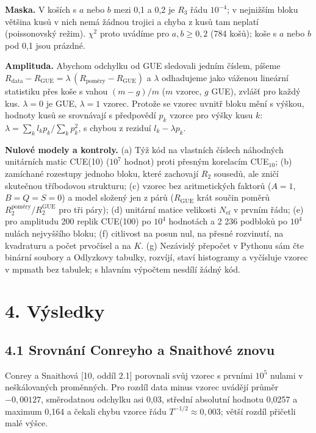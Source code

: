 \documentclass[
  10pt,
]{article}
\begin{document}
\textbf{Maska.} V koších s \(a\) nebo \(b\) mezi 0,1 a 0,2 je \(R_3\)
řádu \(10^{-4}\); v nejnižším bloku většina kusů v nich nemá žádnou
trojici a chyba z kusů tam neplatí (poissonovský režim). \(\chi^2\)
proto uvádíme pro \(a, b \ge 0{,}2\) (784 košů); koše s \(a\) nebo \(b\)
pod 0,1 jsou prázdné.

\textbf{Amplituda.} Abychom odchylku od GUE sledovali jedním číslem,
píšeme
\(R_{\mathrm{data}} - R_{\mathrm{GUE}} = \lambda\,(R_{\mathrm{poměry}} - R_{\mathrm{GUE}})\)
a \(\lambda\) odhadujeme jako váženou lineární statistiku přes koše s
vahou \((m - g)/m\) (\(m\) vzorec, \(g\) GUE), zvlášť pro každý kus.
\(\lambda = 0\) je GUE, \(\lambda = 1\) vzorec. Protože se vzorec uvnitř
bloku mění s výškou, hodnoty kusů se srovnávají s předpovědí \(p_k\)
vzorce pro výšky kusu \(k\):
\(\lambda = \sum_k l_k p_k / \sum_k p_k^2\), s chybou z reziduí
\(l_k - \lambda p_k\).

\textbf{Nulové modely a kontroly.} (a) Týž kód na vlastních číslech
náhodných unitárních matic CUE(10) (\(10^7\) hodnot) proti přesným
korelacím CUE\(_{10}\); (b) zamíchané rozestupy jednoho bloku, které
zachovají \(R_2\) sousedů, ale zničí skutečnou tříbodovou strukturu; (c)
vzorec bez aritmetických faktorů (\(A = 1\), \(B = Q = S = 0\)) a model
složený jen z párů (\(R_{\mathrm{GUE}}\) krát součin poměrů
\(R_2^{\mathrm{poměry}}/R_2^{\mathrm{GUE}}\) pro tři páry); (d) unitární
matice velikosti \(N_{\mathrm{ef}}\) v prvním řádu; (e) pro amplitudu
200 replik CUE(100) po \(10^4\) hodnotách a 2 236 podbloků po \(10^4\)
nulách nejvyššího bloku; (f) citlivost na posun nul, na přesné
rozvinutí, na kvadraturu a počet prvočísel a na \(K\). (g) Nezávislý
přepočet v Pythonu sám čte binární soubory a Odlyzkovy tabulky, rozvíjí,
staví histogramy a vyčísluje vzorec v mpmath bez tabulek; s hlavním
výpočtem nesdílí žádný kód.

\hypertarget{vuxfdsledky}{%
\section{4. Výsledky}\label{vuxfdsledky}}

\hypertarget{srovnuxe1nuxed-conreyho-a-snaithovuxe9-znovu}{%
\subsection{4.1 Srovnání Conreyho a Snaithové
znovu}\label{srovnuxe1nuxed-conreyho-a-snaithovuxe9-znovu}}

Conrey a Snaithová {[}10, oddíl 2.1{]} porovnali svůj vzorec s prvními
\(10^5\) nulami v neškálovaných proměnných. Pro rozdíl data minus vzorec
uvádějí průměr \(-0{,}00127\), směrodatnou odchylku asi 0,03, střední
absolutní hodnotu 0,0257 a maximum 0,164 a čekali chybu vzorce řádu
\(T^{-1/2} \approx 0{,}003\); větší rozdíl přičetli malé výšce.
\end{document}
